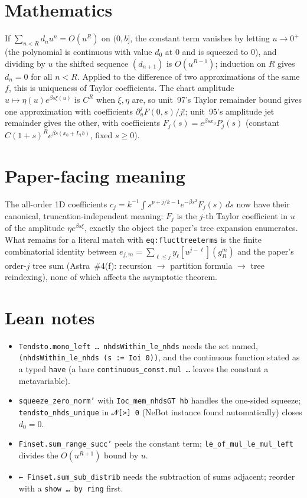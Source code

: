 \documentclass[11pt]{article}
\begin{document}
\section{Mathematics}

If $\sum_{n<R}d_nu^n=O(u^R)$ on $(0,b]$, the constant term vanishes by letting $u\to0^+$ (the
polynomial is continuous with value $d_0$ at $0$ and is squeezed to $0$), and dividing by $u$ the
shifted sequence $(d_{n+1})$ is $O(u^{R-1})$; induction on $R$ gives $d_n=0$ for all $n<R$. Applied
to the difference of two approximations of the same $f$, this is uniqueness of Taylor coefficients.
The chart amplitude $u\mapsto\eta(u)e^{\beta s\xi(u)}$ is $C^R$ when $\xi,\eta$ are, so unit~97's
Taylor remainder bound gives one approximation with coefficients
$\partial_u^jF(0,s)/j!$; unit~95's amplitude jet remainder gives the other, with coefficients
$F_j(s)=e^{\beta sx_0}P_j(s)$ (constant $C(1+s)^Re^{\beta s(x_0+L_1b)}$, fixed $s\ge0$).

\section{Paper-facing meaning}

The all-order 1D coefficients $c_j=k^{-1}\int s^{p+j/k-1}e^{-\beta s^2}F_j(s)\,ds$ now have their
canonical, truncation-independent meaning: $F_j$ is the $j$-th Taylor coefficient in $u$ of the
amplitude $\eta e^{\beta s\xi}$, exactly the object the paper's tree expansion enumerates. What
remains for a literal match with \texttt{eq:flucttreeterms} is the finite combinatorial identity
between $e_{j,m}=\sum_{\ell\le j}y_\ell[u^{j-\ell}](g_R^m)$ and the paper's order-$j$ tree sum
(Astra~\#4(f): recursion $\to$ partition formula $\to$ tree reindexing), none of which affects the
asymptotic theorem.

\section{Lean notes}

\begin{itemize}
\item \texttt{Tendsto.mono\_left … nhdsWithin\_le\_nhds} needs the set named,
\texttt{(nhdsWithin\_le\_nhds (s := Ioi 0))}, and the continuous function stated as a typed
\texttt{have} (a bare \texttt{continuous\_const.mul …} leaves the constant a metavariable).
\item \texttt{squeeze\_zero\_norm'} with \texttt{Ioc\_mem\_nhdsGT hb} handles the one-sided squeeze;
\texttt{tendsto\_nhds\_unique} in \texttt{𝓝[>] 0} (NeBot instance found automatically) closes
$d_0=0$.
\item \texttt{Finset.sum\_range\_succ'} peels the constant term; \texttt{le\_of\_mul\_le\_mul\_left}
divides the $O(u^{R+1})$ bound by $u$.
\item \texttt{← Finset.sum\_sub\_distrib} needs the subtraction of sums adjacent; reorder with a
\texttt{show … by ring} first.
\end{itemize}
\end{document}
